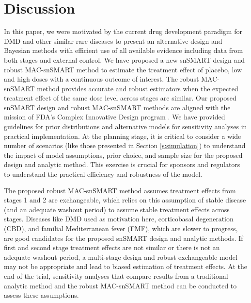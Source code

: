 
\section{Discussion} \label{s:discuss}

In this paper, we were motivated by the current drug development paradigm for \ac{DMD} and other similar rare diseases to present an alternative design and Bayesian methods with efficient use of all available evidence including data from both stages and external control. We have proposed a new \ac{snSMART} design and robust MAC-snSMART method to estimate the treatment effect of placebo, low and high doses with a continuous outcome of interest. The robust MAC-snSMART method provides accurate and robust estimators when the expected treatment effect of the same dose level across stages are similar. Our proposed \ac{snSMART} design and robust MAC-snSMART methods are aligned with the mission of \ac{FDA}'s Complex Innovative Design program \citeyearpar{fdaCID}. We have provided guidelines for prior distributions and alternative models for sensitivity analyses in practical implementation. At the planning stage, it is critical to consider a wide number of scenarios (like those presented in Section \ref{s:simulation}) to understand the impact of model assumptions, prior choice, and sample size for the proposed design and analytic method. This exercise is crucial for sponsors and regulators to understand the practical efficiency and robustness of the model.

The proposed robust MAC-snSMART method assumes treatment effects from stages 1 and 2 are exchangeable, which relies on this assumption of stable disease (and an adequate washout period) to assume stable treatment effects across stages. Diseases like \ac{DMD} used as motivation here, corticobasal degeneration (CBD), and familial Mediterranean fever (FMF), which are slower to progress, are good candidates for the proposed \ac{snSMART} design and analytic methods. If first and second stage treatment effects are not similar or there is not an adequate washout period, a multi-stage design and robust exchangeable model may not be appropriate and lead to biased estimation of treatment effects. At the end of the trial, sensitivity analyses that compare results from a traditional analytic method and the robust MAC-snSMART method can be conducted to assess these assumptions. 

